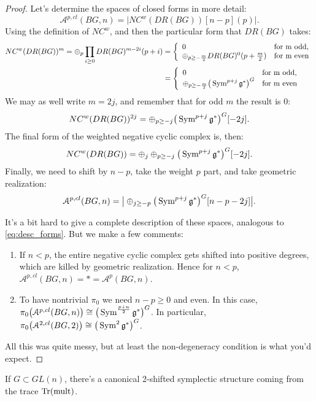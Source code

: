 \begin{proof}
Let's determine the spaces of closed forms in more detail:
\[	\mathcal{A}^{p,cl}(BG,n) = \big| NC^w(DR(BG))[n-p](p)\big|.	\]
Using the definition of $NC^w$, and then the particular form that $DR(BG)$ takes:
\begin{align*}
	NC^w(DR(BG))^m = \oplus_p \prod_{i\geq 0} DR(BG)^{m-2i}(p+i) &= \left\{ \begin{array} {ll}
0 & \text{for m odd}, \\ \oplus_{p\geq - \frac{m}{2}} DR(BG)^0(p+\frac{m}{2}) & \text{for m even}
\end{array} \right. \\
&= \left\{ \begin{array} {ll}
0 & \text{for m odd}, \\ \oplus_{p\geq - \frac{m}{2}} \big(\operatorname{Sym}^{p+j} \mathfrak g^*\big)^G & \text{for m even}
\end{array} \right.
\end{align*}
We may as well write $m=2j$, and remember that for odd $m$ the result is 0:
\[	NC^w(DR(BG))^{2j} = \oplus_{p\geq -j} \big(\operatorname{Sym}^{p+j} \mathfrak g^*\big)^G[-2j].	\]
The final form of the weighted negative cyclic complex is, then:
\[	NC^w(DR(BG)) = \oplus_j \oplus_{p\geq -j} \big(\operatorname{Sym}^{p+j} \mathfrak g^*\big)^G[-2j].	\]
Finally, we need to shift by $n-p$, take the weight $p$ part, and take geometric realization:
\[	\mathcal{A}^{p,cl}(BG,n) = \big|  \oplus_{j\geq -p} \big(\operatorname{Sym}^{p+j} \mathfrak g^*\big)^G[n-p-2j] \big|. \]

It's a bit hard to give a complete description of these spaces, analogous to \ref{eq:desc_forms}. But we make a few comments:
\begin{enumerate}
\item If $n<p$, the entire negative cyclic complex gets shifted into positive degrees, which are killed by geometric realization.
Hence for $n<p$, $\mathcal{A}^{p,cl}(BG,n) = * = \mathcal{A}^{p}(BG,n)$.
\item To have nontrivial $\pi_0$ we need $n-p \geq 0$ and even. In this case, $\pi_0\big(\mathcal{A}^{p,cl}(BG,n)\big)
\cong \big(\operatorname{Sym}^{\frac{p+n}{2}} \mathfrak g^*\big)^G$. In particular, $\pi_0\big(\mathcal{A}^{2,cl}(BG,2)\big)
\cong \big(\operatorname{Sym}^{2} \mathfrak g^*\big)^G$.
\end{enumerate}
All this was quite messy, but at least the non-degeneracy condition is what you'd expect.
\end{proof}

\begin{rem}
\label{rem:symp_trace}
If $G \subset GL(n)$, there's a canonical 2-shifted symplectic structure coming from the trace $\operatorname{Tr}(\text{mult})$.
\end{rem}

